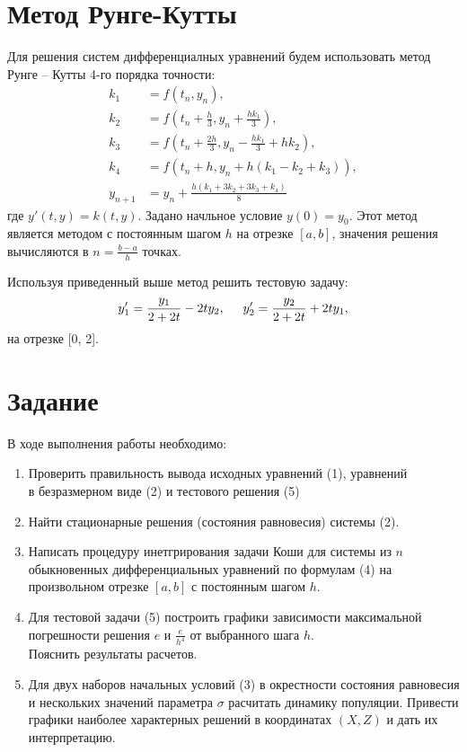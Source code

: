 \documentclass[a4paper,12pt]{article}
\begin{document}
\section{Метод Рунге-Кутты}
\hspace{0.5cm} Для решения систем дифференциалных уравнений будем использовать
метод Рунге -- Кутты 4-го порядка точности:
\begin{align}
    k_1 &= f(t_n, y_n), \nonumber \\
    k_2 &= f(t_n + \frac{h}{3}, y_n + \frac{hk_1}{3}), \nonumber \\
    k_3 &= f(t_n + \frac{2h}{3}, y_n - \frac{hk_1}{3} + hk_2),\\
    k_4 &= f(t_n + h, y_n + h(k_1 - k_2 + k_3)), \nonumber \\
    y_{n+1} &= y_n + \frac{h(k_1 + 3k_2 + 3k_3+ k_4)}{8} \nonumber
\end{align}
где $y'(t,y) = k(t,y)$. Задано начльное условие $y(0) = y_0$. Этот метод является методом
с постоянным шагом $h$ на отрезке $[a, b]$, значения решения вычисляются в $n = \frac{b-a}{h}$ точках.

Используя приведенный выше метод решить тестовую задачу:
\begin{equation}
    y'_1 = \frac{y_1}{2 + 2t} - 2ty_2, \hspace{0.5cm} y'_2 = \frac{y_2}{2 + 2t} + 2ty_1,
\end{equation}
на отрезке [0, 2].
\newpage

\section{Задание}
\hspace{0.5cm} В ходе выполнения работы необходимо:
\begin{enumerate}
    \item Проверить правильность вывода исходных уравнений (1), уравнений \\
    в безразмерном виде (2) и тестового решения (5)
    \item Найти стационарные решения (состояния равновесия) системы (2).
    \item Написать процедуру инетгрирования задачи Коши для системы из $n$ \\
    обыкновенных дифференциальных уравнений по формулам (4) на произвольном отрезке
    $[a, b]$ с постоянным шагом $h$.
    \item Для тестовой задачи (5) построить графики зависимости максимальной\\
    погрешности решения $e$ и $\frac{e}{h^4}$ от выбранного шага $h$. \\
    Пояснить результаты расчетов.
    \item Для двух наборов начальных условий (3) в окрестности состояния равновесия и нескольких значений
    параметра $\sigma$ расчитать динамику популяции. Привести графики наиболее характерных решений в координатах $(X, Z)$ и дать их \\
    интерпретацию.
\end{enumerate}
\newpage
\end{document}
